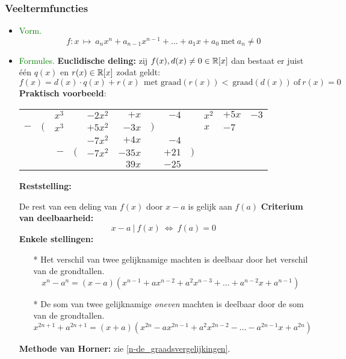 \subsubsection{Veeltermfuncties} \label{veeltermfuncties}
		\begin{itemize}%
		\item \textcolor{green}{Vorm.}
		\[f:x\, \mapsto \: a_nx^n+a_{n-1}x^{n-1}+\ldots +a_1x+a_0\:\mbox{met} \:a_n\neq 0\]
		\item \textcolor{green}{Formules.}\newline
		\hypertarget{euclidische_deling}{{\bf Euclidische deling:}}\label{euclidische_deling} zij $f(x), d(x) \neq 0 \in\mathbb{R} 		[x]$ dan bestaat er juist \'e\'en $q(x)$ en $r(x) \in\mathbb{R} [x]$ zodat geldt:
		 \[f(x)=d(x)\cdot q(x)+r(x)\:\:\mbox{met 		graad}(r(x))<\:\mbox{graad}(d(x))\:\mbox{of}\:r(x)=0\]\newline
		{\bf Praktisch voorbeeld}:
		\begin{center}
    {\renewcommand{\tabcolsep}{1pt}
    \begin{tabular}{rrrrrrrrr|lll}
         &   &$x^3$&   &$-2x^2$&$+x$  &   &$-4$ &&$x^2$&$+5x$&$-3$\\
      \cline{10-12}
      $-$&$($&$x^3$&   &$+5x^2$&$-3x$ &$)$&     &&$x$  &$-7$\\
      \cline{1-7}
         &   &     &   &$-7x^2$&$+4x$ &   &$-4$ &\\
         &   &$-$  &$($&$-7x^2$&$-35x$&   &$+21$&$)$\\
      \cline{3-9}
         &   &     &   &       &$39x$ &   &$-25$&\\
    \end{tabular}
    }
    \end{center}

		\hypertarget{reststelling}{{\bf Reststelling:}}\label{reststelling} De rest van een deling van $f(x)$ door $x-a$ 		is gelijk aan $f(a)$\newline\newline
		{\bf Criterium van deelbaarheid:} \[x-a \: |\: f(x)\:\Leftrightarrow\: f(a)=0\]
		\hypertarget{merkwaardige_quotienten}{{\bf Enkele stellingen:}}\label{merkwaardige_quotienten} 
		\begin{itemize}
		\item[*]Het verschil van twee gelijknamige machten is deelbaar door het verschil van 		de grondtallen.
		\[x^n-a^n=(x-a)(x^{n-1}+ax^{n-2}+a^2x^{n-3}+\ldots+a^{n-2}x+a^{n-1})\]
		\item[*]De som van twee gelijknamige {\it oneven} machten is deelbaar door de som 		van de grondtallen.
		\[x^{2n+1}+a^{2n+1}=(x+a)(x^{2n}-ax^{2n-1}+a^2x^{2n-2}-\ldots-a^{2n-1}x+a^{2n})\]
		\end{itemize}
		{\bf Methode van Horner:} zie \ref{n-de_graadsvergelijkingen}.
		\end{itemize}%

